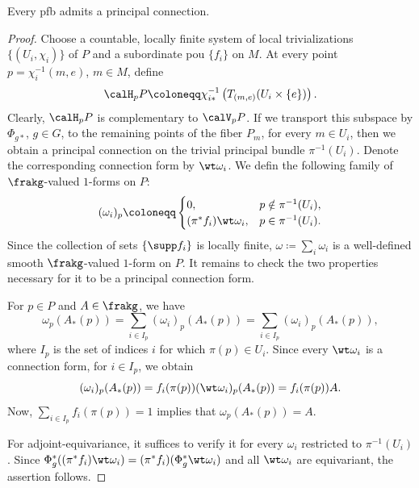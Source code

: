 \begin{prop}
    Every \gls{pfb} admits a principal connection.
\end{prop}
\begin{proof}
    Choose a countable, locally finite system of local trivializations $\{(U_i,\chi_i)\}$ of $P$ and a subordinate \gls{pou} $\{f_i\}$ on $M$. At every point $p=\chi_i^{-1}(m,e)$, $m\in M$, define
    \[\calH_pP\coloneqq \chi_{i\ast}^{-1} \left(T_{(m,e)}(U_i\times\{e\})\right).\]
    Clearly, $\calH_pP$ is complementary to $\calV_pP$. If we transport this subspace by $\Phi_{g\ast}$, $g\in G$, to the remaining points of the fiber $P_m$, for every $m\in U_i$, then we obtain a principal connection on the trivial principal bundle $\pi^{-1}(U_i)$. Denote the corresponding connection form by $\wt\omega_i$. We defin the following family of $\frakg$-valued $1$-forms on $P$:
    \[(\omega_i)_p\coloneqq 
    \begin{cases}
        0,&p\notin \pi^{-1}(U_i),\\
        (\pi^\ast f_i)\wt\omega_i, & p\in\pi^{-1}(U_i).
    \end{cases}
    \]
    Since the collection of sets $\{\supp f_i\}$ is locally finite, $\omega\coloneqq\sum_i \omega_i$ is a well-defined smooth $\frakg$-valued $1$-form on $P$. It remains to check the two properties necessary for it to be a principal connection form.

    For $p\in P$ and $A\in\frakg$, we have
    \[\omega_p(A_\ast(p))=\sum_{i\in I_p} (\omega_i)_p(A_\ast(p))=\sum_{i\in I_p} (\omega_i)_p(A_\ast(p)),\]
    where $I_p$ is the set of indices $i$ for which $\pi(p)\in U_i$. Since every $\wt\omega_i$ is a connection form, for $i\in I_p$, we obtain
    \[(\omega_i)_p(A_\ast(p))=f_i(\pi(p))(\wt\omega_i)_p(A_\ast(p))=f_i(\pi(p))A.\]
    Now, $\sum_{i\in I_p} f_i(\pi(p))=1$ implies that $\omega_p(A_\ast(p))=A$.

    For adjoint-equivariance, it suffices to verify it for every $\omega_i$ restricted to $\pi^{-1}(U_i)$. Since  $\Phi_g^\ast((\pi^\ast f_i)\wt\omega_i)=(\pi^\ast f_i)(\Phi_g^\ast \wt\omega_i)$ and all $\wt\omega_i$ are equivariant, the assertion follows.
\end{proof}

